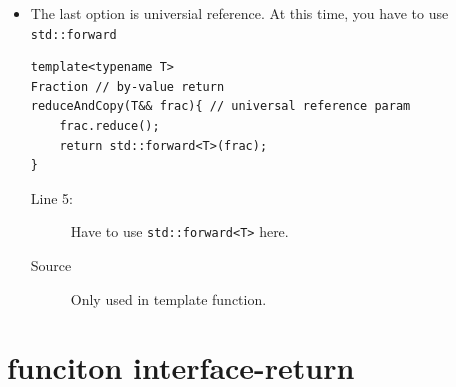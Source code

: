 \documentclass[a4paper,11pt,twoside]{book}
\begin{document}
\begin{itemize}
\item The last option is universial reference. At this time, you have to use \texttt{std::forward} 
\begin{lstlisting}[]
template<typename T>
Fraction // by-value return
reduceAndCopy(T&& frac){ // universal reference param
	frac.reduce();
	return std::forward<T>(frac); 
} 
\end{lstlisting}
\begin{description}
	\item[Line 5:] Have to use \texttt{std::forward<T>} here.
	\item[Source] Only used in template function.
\end{description}

\end{itemize}

\section{funciton interface-return}
\end{document}
